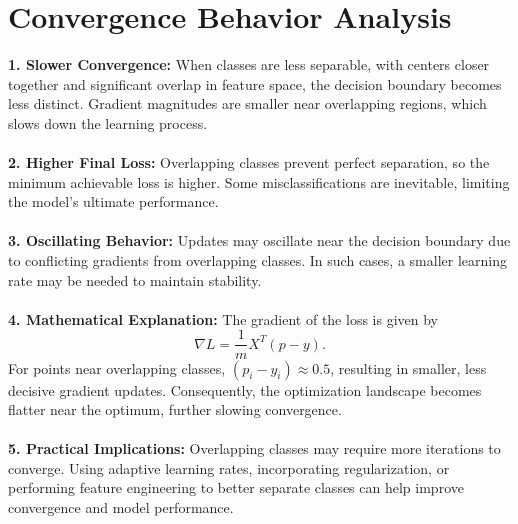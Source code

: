 \documentclass[12pt]{article}
\begin{document}
\section*{Convergence Behavior Analysis}

\textbf{1. Slower Convergence:} When classes are less separable, with centers closer together and significant overlap in feature space, the decision boundary becomes less distinct. Gradient magnitudes are smaller near overlapping regions, which slows down the learning process.\\
\\
\textbf{2. Higher Final Loss:} Overlapping classes prevent perfect separation, so the minimum achievable loss is higher. Some misclassifications are inevitable, limiting the model’s ultimate performance.\\
\\
\textbf{3. Oscillating Behavior:} Updates may oscillate near the decision boundary due to conflicting gradients from overlapping classes. In such cases, a smaller learning rate may be needed to maintain stability.\\
\\
\textbf{4. Mathematical Explanation:} The gradient of the loss is given by 
\[
\nabla L = \frac{1}{m} X^T (p - y).
\] 
For points near overlapping classes, $(p_i - y_i) \approx 0.5$, resulting in smaller, less decisive gradient updates. Consequently, the optimization landscape becomes flatter near the optimum, further slowing convergence.\\
\\
\textbf{5. Practical Implications:} Overlapping classes may require more iterations to converge. Using adaptive learning rates, incorporating regularization, or performing feature engineering to better separate classes can help improve convergence and model performance.
\end{document}
